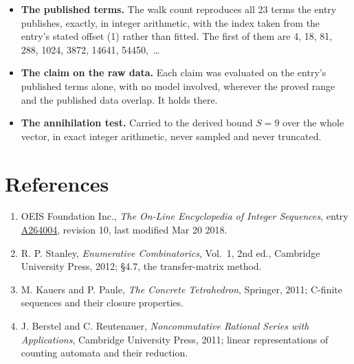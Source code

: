 \documentclass[11pt]{article}
\theoremstyle{definition}
\begin{document}
\begin{itemize}

\item {\bfseries The published terms.} The walk count reproduces all 23 terms the entry publishes, exactly, in integer arithmetic, with the index taken from the entry's stated offset (1) rather than fitted. The first of them are 4, 18, 81, 288, 1024, 3872, 14641, 54450,~\dots

\item {\bfseries The claim on the raw data.} Each claim was evaluated on the entry's published terms alone, with no model involved, wherever the proved range and the published data overlap. It holds there.

\item {\bfseries The annihilation test.} Carried to the derived bound $S = 9$ over the whole vector, in exact integer arithmetic, never sampled and never truncated.

\end{itemize}

\section{References}

\begin{enumerate}

\item OEIS Foundation Inc., \emph{The On-Line Encyclopedia of Integer Sequences}, entry \href{https://oeis.org/A264004}{A264004}, revision 10, last modified Mar 20 2018.

\item R. P. Stanley, \emph{Enumerative Combinatorics}, Vol.~1, 2nd ed., Cambridge University Press, 2012; \S4.7, the transfer-matrix method.

\item M. Kauers and P. Paule, \emph{The Concrete Tetrahedron}, Springer, 2011; C-finite sequences and their closure properties.

\item J. Berstel and C. Reutenauer, \emph{Noncommutative Rational Series with Applications}, Cambridge University Press, 2011; linear representations of counting automata and their reduction.

\end{enumerate}
\end{document}
